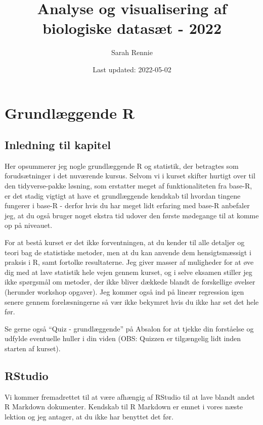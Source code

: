 \documentclass[
]{book}
\title{Analyse og visualisering af biologiske datasæt - 2022}
\author{Sarah Rennie}
\date{Last updated: 2022-05-02}
\begin{document}
\maketitle

{
\setcounter{tocdepth}{1}
\tableofcontents
}
\hypertarget{baser}{%
\chapter{Grundlæggende R}\label{baser}}

\hypertarget{inledning-til-kapitel}{%
\section{Inledning til kapitel}\label{inledning-til-kapitel}}

Her opsummerer jeg nogle grundlæggende R og statistik, der betragtes som forudsætninger i det nuværende kursus. Selvom vi i kurset skifter hurtigt over til den tidyverse-pakke løsning, som erstatter meget af funktionaliteten fra base-R, er det stadig vigtigt at have et grundlæggende kendskab til hvordan tingene fungerer i base-R - derfor hvis du har meget lidt erfaring med base-R anbefaler jeg, at du også bruger noget ekstra tid udover den første mødegange til at komme op på niveauet.

For at bestå kurset er det ikke forventningen, at du kender til alle detaljer og teori bag de statistiske metoder, men at du kan anvende dem hensigtsmæssigt i praksis i R, samt fortolke resultaterne. Jeg giver masser af muligheder for at øve dig med at lave statistik hele vejen gennem kurset, og i selve eksamen stiller jeg ikke spørgsmål om metoder, der ikke bliver dækkede blandt de forskellige øvelser (herunder workshop opgaver). Jeg kommer også ind på lineær regression igen senere gennem forelæsningerne så vær ikke bekymret hvis du ikke har set det hele før.

Se gerne også ``Quiz - grundlæggende'' på Absalon for at tjekke din forståelse og udfylde eventuelle huller i din viden (OBS: Quizzen er tilgængelig lidt inden starten af kurset).

\hypertarget{rstudio}{%
\section{RStudio}\label{rstudio}}

Vi kommer fremadrettet til at være afhængig af RStudio til at lave blandt andet R Markdown dokumenter. Kendskab til R Markdown er emnet i vores næste lektion og jeg antager, at du ikke har benyttet det før.
\end{document}
